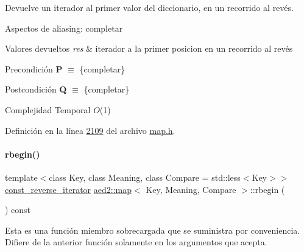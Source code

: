 Devuelve un iterador al primer valor del diccionario, en un recorrido al revés. 

\begin{DoxyParagraph}{Aspectos de aliasing\+:}
completar
\end{DoxyParagraph}

\begin{DoxyRetVals}{Valores devueltos}
{\em res} & iterador a la primer posicion en un recorrido al revés\\
\hline
\end{DoxyRetVals}
\begin{DoxyPrecond}{Precondición}
{\bfseries P} $\equiv$ \{completar\} 
\end{DoxyPrecond}
\begin{DoxyPostcond}{Postcondición}
{\bfseries Q} $\equiv$ \{completar\}
\end{DoxyPostcond}

\begin{DoxyDescription}
\item[Complejidad Temporal]$O$(1)
\end{DoxyDescription}

Definición en la línea \hyperlink{map_8h_source_l02109}{2109} del archivo \hyperlink{map_8h_source}{map.\+h}.

\mbox{\label{classaed2_1_1map_a71ab53ab04f5e35a189c6576fddeb483_a71ab53ab04f5e35a189c6576fddeb483}} 
\paragraph{\texorpdfstring{rbegin()}{rbegin()}\hspace{0.1cm}{\footnotesize\ttfamily [2/2]}}
{\footnotesize\ttfamily template$<$class Key, class Meaning, class Compare = std\+::less$<$\+Key$>$$>$ \\
\hyperlink{classaed2_1_1map_aed66a216549d13078a3ea6978ea0b768_aed66a216549d13078a3ea6978ea0b768}{const\+\_\+reverse\+\_\+iterator} \hyperlink{classaed2_1_1map}{aed2\+::map}$<$ Key, Meaning, Compare $>$\+::rbegin (\begin{DoxyParamCaption}{ }\end{DoxyParamCaption}) const\hspace{0.3cm}{\ttfamily [inline]}}

Esta es una función miembro sobrecargada que se suministra por conveniencia. Difiere de la anterior función solamente en los argumentos que acepta. 

